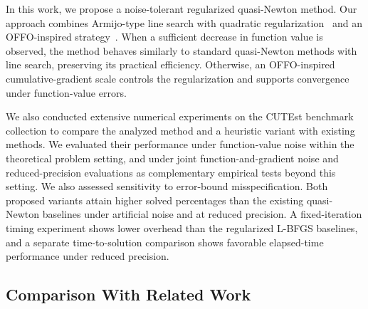 \documentclass[journal_revised_MPC]{subfiles}
\begin{document}
In this work, we propose a noise-tolerant regularized quasi-Newton method.
Our approach combines Armijo-type line search with quadratic regularization~\citep{uedaRegularizedNewtonMethod2014,kanzowRegularizationLimitedMemory2023} and an OFFO-inspired strategy~\citep{Gratton08022024,grattonOFFOMinimizationAlgorithms2023}.
When a sufficient decrease in function value is observed, the method behaves similarly to standard quasi-Newton methods with line search, preserving its practical efficiency.
Otherwise, an OFFO-inspired cumulative-gradient scale controls the regularization and supports convergence under function-value errors.


We also conducted extensive numerical experiments on the CUTEst benchmark collection to compare the analyzed method and a heuristic variant with existing methods.
We evaluated their performance under function-value noise within the theoretical problem setting, and under joint function-and-gradient noise and reduced-precision evaluations as complementary empirical tests beyond this setting.
We also assessed sensitivity to error-bound misspecification.
Both proposed variants attain higher solved percentages than the existing quasi-Newton baselines under artificial noise and at reduced precision.
A fixed-iteration timing experiment shows lower overhead than the regularized L-BFGS baselines, and a separate time-to-solution comparison shows favorable elapsed-time performance under reduced precision.

\subsection{Comparison With Related Work}
\label{sec:related_work}
\end{document}
